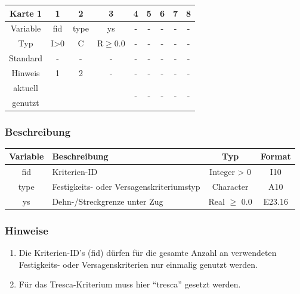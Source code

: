 \documentclass[11pt,titlepage,listof=totoc,bibliography=totoc,twoside]{scrreprt}
\begin{document}
{{\begin{table}[htbp]
\centering
\begin{tabularx}{\textwidth}{cCCCcCCCC}
\toprule
Karte 1	& 1		& 2		& 3		& 4			& 5		& 6		& 7		& 8	\\
\midrule
Variable& fid		& type		& ys		& -			& -		& -		& -		& -	\\
Typ	& I>0		& C		& R$\ge$0.0	& -			& -		& -		& -		& -	\\
Standard& -		& -		& -		& -			& -		& -		& -		& -	\\
Hinweis	& 1		& 2		& -		& -			& -		& -		& -		& -	\\
aktuell	& 	& 	& 	& 	& 	& \multirow{2}{*}{-}	& 	& 	\\
genutzt \\
\bottomrule
\end{tabularx}
\end{table}

\subsubsection{Beschreibung}

\begin{tabularx}{\textwidth}{cXcc}
\toprule
Variable& Beschreibung														& Typ			& Format\\
\midrule
fid	& Kriterien-ID														& Integer > 0		& I10	\\
type	& Festigkeits- oder Versagenskriteriumstyp										& Character		& A10	\\
ys	& Dehn-/Streckgrenze unter Zug												& Real $\ge$ 0.0	& E23.16\\
\bottomrule
\end{tabularx}

\subsubsection{Hinweise}

\begin{enumerate}
\item Die Kriterien-ID's (fid) dürfen für die gesamte Anzahl an verwendeten Festigkeits- oder Versagenskriterien nur einmalig genutzt werden.
\item Für das Tresca-Kriterium muss hier ``tresca'' gesetzt werden.
\end{enumerate}

}}
\end{document}
